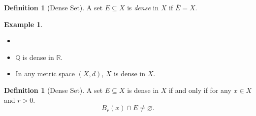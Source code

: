 \documentclass[12pt, lettersize]{book}
\theoremstyle{plain}
\theoremstyle{definition}
\newtheorem{dfn}[thm]{Definition}
\newtheorem*{eg}{Example}
\theoremstyle{remark}
\newcommand{\R}{\mathbb{R}}
\newcommand{\Q}{\mathbb{Q}}
\let\emptyset\varnothing
\begin{document}
		\begin{dfn}[Dense Set]
			A set $E\subseteq X$ is \emph{dense} in $X$ if $\bar{E}=X$.
		\end{dfn}
		\begin{eg}
			\begin{itemize}
				\item[]
				\item $\Q$ is dense in $\R$.
				\item In any metric space $(X,d)$, $X$ is dense in $X$. 
			\end{itemize}
		\end{eg}
		
		\begin{dfn}[Dense Set]
			A set $E\subseteq X$ is dense in $X$ if and only if for any $x\in X$ and $r>0$.
			\begin{displaymath}
				B_r(x)\cap E\neq\emptyset.
			\end{displaymath} 
		\end{dfn}
		
\end{document}
